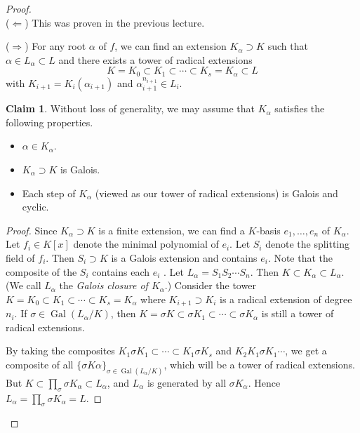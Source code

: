 \documentclass[10pt,letterpaper,cm]{nupset}
\theoremstyle{definition}
\theoremstyle{theorem}
\newtheorem*{claim}{Claim}
\theoremstyle{remark}
\newcommand{\1}{\mathbf{1}}
\newcommand{\0}{\vec 0}
\DeclareMathOperator{\gal}{Gal}
\begin{document}
\begin{proof} $ $
\\
($\Longleftarrow$) This was proven in the previous lecture.

\medskip


($\Longrightarrow$) For any root $\alpha$ of $f$, we can find an extension $K_{\alpha} \supset K$ such that  $\alpha \in L_{\alpha} \subset L$ and there exists a tower of radical extensions $$ K = K_0 \subset K_1 \subset \cdots \subset K_s = K_{\alpha} \subset L$$ with $K_{i+1} = K_i(\alpha_{i+1})$ and $\alpha_{i+1}^{n_{i+1}} \in L_i$. 
\begin{claim}
Without loss of generality, we may assume that $K_{\alpha}$ satisfies the following properties.
\begin{itemize}
\item $\alpha \in K_{\alpha}$.
\item $K_{\alpha} \supset K$ is Galois.
\item Each step of $K_{\alpha}$ (viewed as our tower of radical extensions) is Galois and cyclic. 
\end{itemize}
\end{claim}
\begin{proof}
Since $K_{\alpha}\supset K$ is a finite extension, we can find a $K$-basis $e_1, \ldots, e_n$ of $K_{\alpha}$. Let $f_i \in K[x]$ denote the minimal polynomial of $e_i$. Let $S_i$ denote the splitting field of $f_i$. Then $S_i \supset K$ is a Galois extension and contains $e_i$. Note that the composite of the $S_i$ contains each $e_i$ . Let $L_{\alpha} = S_1S_2 \cdots S_n$. Then $K \subset K_{\alpha} \subset L_{\alpha}$. (We call $L_{\alpha}$ the \textit{Galois closure of $K_{\alpha}$}.) Consider the tower $K = K_0 \subset K_1 \subset \cdots \subset K_s = K_{\alpha}$ where $K_{i+1} \supset K_i$ is a radical extension of degree $n_i$. If $\sigma \in \gal(L_{\alpha}/K)$, then $K = \sigma{K} \subset \sigma{K_1} \subset \cdots \subset \sigma{K_{\alpha}}$ is still a tower of radical extensions. 

\medskip

By taking the composites $K_1\sigma K_1 \subset \cdots \subset K_1\sigma K_s$ and $K_2K_1\sigma{K_1} \cdots$, we get  a composite of all $\{\sigma{K}{\alpha}\}_{\sigma \in \gal(L_{\alpha}/K)}$, which will be a tower of radical extensions. But $K \subset \prod_{\sigma} \sigma{K_{\alpha}} \subset L_{\alpha}$, and $L_{\alpha}$ is generated by all $\sigma{K_{\alpha}}$. Hence $L_{\alpha} = \prod_{\sigma} \sigma{K_{\alpha}} =L$.


\end{proof}
\end{proof}
\end{document}
